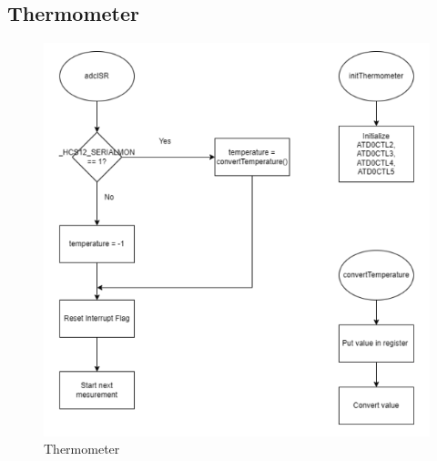 \documentclass[a4paper,12pt]{article}
\begin{document}
\subsection{Thermometer}
\begin{figure}[H]
    \centering
    \includegraphics[width=1\textwidth]{diagrams/thermometer.png}
    \caption{Thermometer}
    \label{fig:Thermometer}
\end{figure}

\newpage
\end{document}
